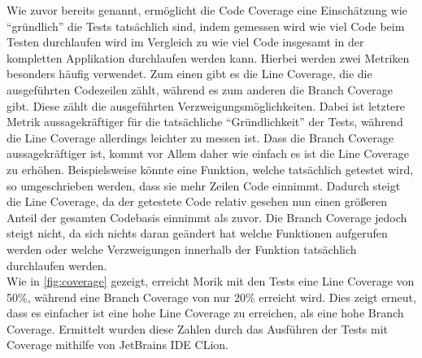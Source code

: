 Wie zuvor bereits genannt, ermöglicht die Code Coverage eine Einschätzung wie \enquote{gründlich} die Tests tatsächlich sind, indem gemessen wird wie viel Code beim Testen durchlaufen wird im Vergleich zu wie viel Code insgesamt in der kompletten Applikation durchlaufen werden kann. Hierbei werden zwei Metriken besonders häufig verwendet. Zum einen gibt es die Line Coverage, die die ausgeführten Codezeilen zählt, während es zum anderen die Branch Coverage gibt. Diese zählt die ausgeführten Verzweigungsmöglichkeiten. Dabei ist letztere Metrik aussagekräftiger für die tatsächliche \enquote{Gründlichkeit} der Tests, während die Line Coverage allerdings leichter zu messen ist. Dass die Branch Coverage aussagekräftiger ist, kommt vor Allem daher wie einfach es ist die Line Coverage zu erhöhen. Beispielsweise könnte eine Funktion, welche tatsächlich getestet wird, so umgeschrieben werden, dass sie mehr Zeilen Code einnimmt. Dadurch steigt die Line Coverage, da der getestete Code relativ gesehen nun einen größeren Anteil der gesamten Codebasis einnimmt als zuvor. Die Branch Coverage jedoch steigt nicht, da sich nichts daran geändert hat welche Funktionen aufgerufen werden oder welche Verzweigungen innerhalb der Funktion tatsächlich durchlaufen werden.\\
Wie in \autoref{fig:coverage} gezeigt, erreicht Morik mit den Tests eine Line Coverage von 50\%, während eine Branch Coverage von nur 20\% erreicht wird. Dies zeigt erneut, dass es einfacher ist eine hohe Line Coverage zu erreichen, als eine hohe Branch Coverage. Ermittelt wurden diese Zahlen durch das Ausführen der Tests mit Coverage mithilfe von JetBrains IDE CLion.

